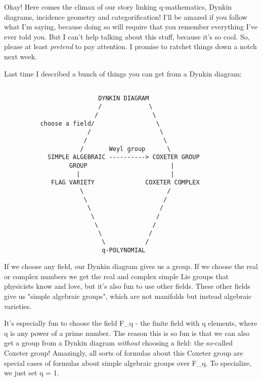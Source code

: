 





Okay!  Here comes the climax of our story linking q-mathematics, 
Dynkin diagrams, incidence geometry and categorification!  I'll
be amazed if you follow what I'm saying, because doing so will require
that you remember everything I've ever told you.  But I can't help 
talking about this stuff, because it's so cool.   So, please at least 
\emph{pretend} to pay attention.  I promise to ratchet things down a notch
next week.

Last time I described a bunch of things you can get from a 
Dynkin diagram:



\begin{verbatim}

                          DYNKIN DIAGRAM
                          /             \
                         /               \
          choose a field/                 \ 
                       /                   \
                      /                     \
                     /       Weyl group      \
            SIMPLE ALGEBRAIC ----------> COXETER GROUP 
                  GROUP                       | 
                    |                         | 
             FLAG VARIETY              COXETER COMPLEX 
                     \                       /
                      \                     /
                       \                   /
                        \                 /
                         \               /
                          \             /
                           \           /
                           q-POLYNOMIAL
\end{verbatim}
    

If we choose any field, our Dynkin diagram gives us a group.  If we
choose the real or complex numbers we get the real and complex simple
Lie groups that physicists know and love, but it's also fun to use other
fields.  These other fields give us "simple algebraic groups",
which are not manifolds but instead algebraic varieties.

It's especially fun to choose the field F_{q} - the finite field with q
elements, where q is any power of a prime number.   The reason this is
so fun is that we can also get a group from a Dynkin diagram \emph{without}
choosing a field: the so-called Coxeter group!  Amazingly, all sorts of
formulas about this Coxeter group are special cases of formulas about
simple algebraic groups over F_{q}.  To specialize, we just set q = 1.   

